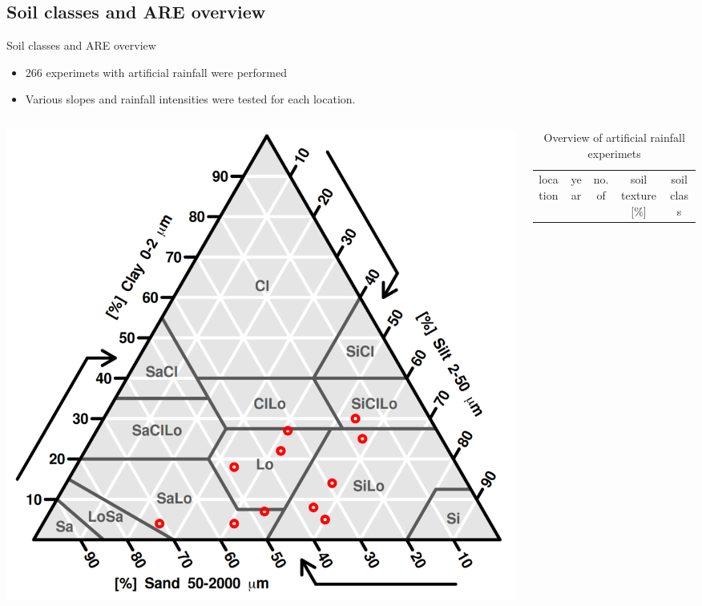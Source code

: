 \subsection{Soil classes and ARE overview}
\begin{block}{Soil classes and ARE overview}
    \begin{itemize}
        \item 266 experimets with artificial rainfall were performed 
        \item Various slopes and rainfall intensities were tested for each location.
    \end{itemize}

    \begin{columns}
        \begin{column}{0.4\textwidth}
            \includegraphics[width=1.05\textwidth]{obr/soil_triangle.png}
        \end{column}
        \begin{column}{0.6\textwidth}
            {\small 
            \begin{table}[]
            \caption{ Overview of artificial rainfall experimets}
                \begin{tabular}{lcccccc}
                \hline
                \hline
                location      & year    & no. of            & \multicolumn{3}{c}{soil texture {[}\%{]}}  & soil class      \\

\end{tabular}
\end{table}}
\end{column}
\end{columns}
\end{block}
